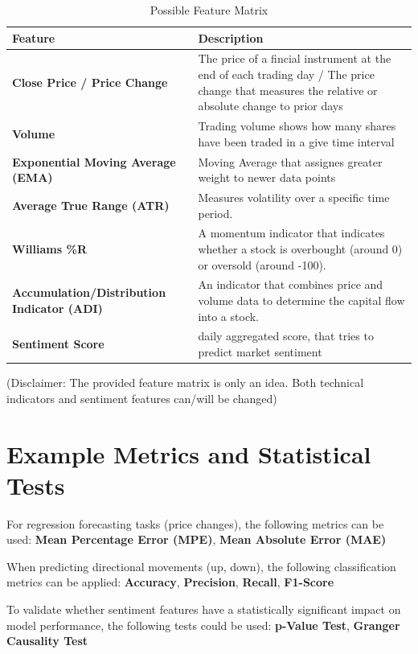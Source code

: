 \documentclass[MAI,Projekt,english,IEEE]{twbook}%
\begin{document}
\begin{table}[H]
\centering
\caption{Possible Feature Matrix}
\begin{tabularx}{\textwidth}{l X}
\hline
\textbf{Feature} & \textbf{Description} \\ 
\hline
\textbf{Close Price / Price Change} & 
The price of a fincial instrument at the end of each trading day / The price change that measures the relative or absolute change to prior days \\
\hline
\textbf{Volume} & 
Trading volume shows how many shares have been traded in a give time interval \\
\hline
\textbf{Exponential Moving Average (EMA)} & 
Moving Average that assignes greater weight to newer data points \\
\hline
\textbf{Average True Range (ATR)} &
Measures volatility over a specific time period. \\
\hline
\textbf{Williams \%R} & 
A momentum indicator that indicates whether a stock is overbought (around 0) or oversold (around -100). \\
\hline
\textbf{Accumulation/Distribution Indicator (ADI)} & 
An indicator that combines price and volume data to determine the capital flow into a stock. \\
\hline
\textbf{Sentiment Score} & 
daily aggregated score, that tries to predict market sentiment \\
\hline
\end{tabularx}
\end{table}

(Disclaimer: The provided feature matrix is only an idea. Both technical indicators and sentiment features can/will be changed)

\section{Example Metrics and Statistical Tests}
For regression forecasting tasks (price changes), the following metrics can be used: \textbf{Mean Percentage Error (MPE)}, \textbf{Mean Absolute Error (MAE)}

When predicting directional movements (up, down), the following classification metrics can be applied: \textbf{Accuracy}, \textbf{Precision}, \textbf{Recall}, \textbf{F1-Score}

To validate whether sentiment features have a statistically significant impact on model performance, the following tests could be used: \textbf{p-Value Test}, \textbf{Granger Causality Test}
\end{document}

